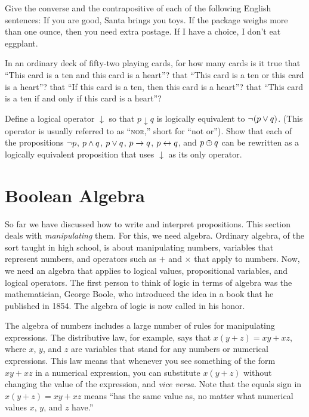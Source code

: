 \begin{exercises}
\problem Give the converse and the contrapositive of each of
the following English sentences:
\ppart If you are good, Santa brings you toys.
\ppart If the package weighs more than one ounce, then you need extra postage.
\ppart If I have a choice, I don't eat eggplant.

\problem In an ordinary deck of fifty-two playing cards, for how many cards is it true 
\ppart that ``This card is a ten and this card is a heart''?
\ppart that ``This card is a ten or this card is a heart''?
\ppart that ``If this card is a ten, then this card is a heart''?
\ppart that ``This card is a ten if and only if this card is a heart''?

\problem Define a logical operator $\downarrow$ so that
$p\downarrow q$ is logically equivalent to $\lnot(p\vee q)$.
(This operator is usually referred to as ``\textsc{nor},'' short 
for ``not or'').  Show that each of the propositions
$\lnot p$, $p\wedge q$, $p\vee q$, $p\rightarrow q$, $p\leftrightarrow q$, and
$p\oplus q$ can be rewritten as a logically equivalent proposition
that uses $\downarrow$ as its only operator.


\end{exercises}




\section{Boolean Algebra}\label{S-logic-2}

So far we have discussed how to write and interpret propositions.
This section deals with \emph{manipulating} them.  For this,
we need algebra.  Ordinary algebra, of the sort taught in high
school, is about manipulating numbers, variables that represent numbers,
and operators such as $+$ and $\times$ that apply to numbers.
Now, we need an algebra that applies to logical values, propositional
variables, and logical operators.  The first person to think of
logic in terms of algebra was the mathematician, George Boole,
who introduced the idea in a book that he
published in 1854.  The algebra of logic is now called 
 in his honor.

The algebra of numbers includes a large number of rules for
manipulating expressions.  The distributive law, for example,
says that $x(y+z)=xy+xz$, where $x$, $y$, and $z$ are variables
that stand for any numbers or numerical expressions.  This law
means that whenever you see something of the form $xy+xz$
in a numerical expression, you can substitute $x(y+z)$ without
changing the value of the expression, and \textit{vice versa}.  Note that
the equals sign in $x(y+z)=xy+xz$ means ``has the same value as,
no matter what numerical values $x$, $y$, and $z$ have.''

